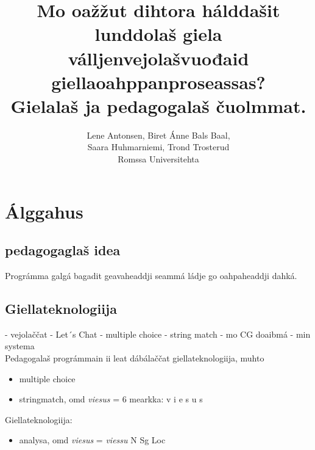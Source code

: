 \documentclass[a4paper,14pt]{article}
\begin{document}
\title{Mo oažžut dihtora hálddašit lunddolaš giela válljenvejolašvuođaid giellaoahppanproseassas? \\ Gielalaš ja pedagogalaš čuolmmat.}   
\author{Lene Antonsen, Biret Ánne Bals Baal, \\ Saara Huhmarniemi, Trond Trosterud \\ Romssa Universitehta} 
\date{} 
\maketitle
{}
 
\maketitle
\tableofcontents


\section{Álggahus}

\subsection{pedagogaglaš idea}
Prográmma galgá bagadit geavaheaddji seammá ládje go oahpaheaddji dahká.




\subsection{Giellateknologiija}
- vejolaččat - Let´s Chat - multiple choice
- string match
- mo CG doaibmá
- min systema \\

Pedagogalaš prográmmain ii leat dábálaččat giellateknologiija, muhto
\begin{itemize}
\item multiple choice 
\item stringmatch, omd \textit{viesus} = 6 mearkka: v i e s u s
\end{itemize}
Giellateknologiija:
\begin{itemize}
\item analysa, omd \textit{viesus} = \textit{viessu} N Sg Loc
\end{itemize}
\end{document}
